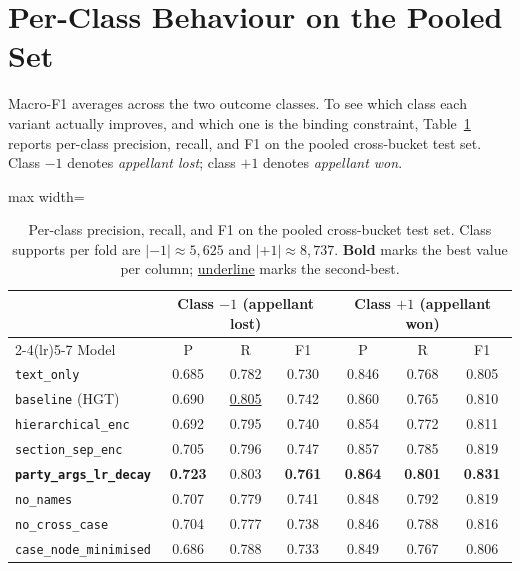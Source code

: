 \section{Per-Class Behaviour on the Pooled Set}
\label{sec:per_class_behaviour}

Macro-F1 averages across the two outcome classes. To see which class
each variant actually improves, and which one is the binding
constraint, Table~\ref{tab:per_class_pooled} reports per-class
precision, recall, and F1 on the pooled cross-bucket test set. Class
$-1$ denotes \emph{appellant lost}; class $+1$ denotes
\emph{appellant won}.

\begin{table}[H]
  \centering
  \scriptsize
  \setlength{\tabcolsep}{5pt}
  \begin{adjustbox}{max width=\textwidth}
  \begin{tabular}{lcccccc}
    \toprule
    & \multicolumn{3}{c}{Class $-1$ (appellant lost)} & \multicolumn{3}{c}{Class $+1$ (appellant won)} \\
    \cmidrule(lr){2-4}\cmidrule(lr){5-7}
    Model & P & R & F1 & P & R & F1 \\
    \midrule
    \texttt{text\_only} & 0.685 & 0.782 & 0.730 & 0.846 & 0.768 & 0.805 \\
    \texttt{baseline} (HGT) & 0.690 & \underline{0.805} & 0.742 & 0.860 & 0.765 & 0.810 \\
    \texttt{hierarchical\_enc} & 0.692 & 0.795 & 0.740 & 0.854 & 0.772 & 0.811 \\
    \texttt{section\_sep\_enc} & 0.705 & 0.796 & 0.747 & 0.857 & 0.785 & 0.819 \\
    \textbf{\texttt{party\_args\_lr\_decay}} & \textbf{0.723} & 0.803 & \textbf{0.761} & \textbf{0.864} & \textbf{0.801} & \textbf{0.831} \\
    \texttt{no\_names} & 0.707 & 0.779 & 0.741 & 0.848 & 0.792 & 0.819 \\
    \texttt{no\_cross\_case} & 0.704 & 0.777 & 0.738 & 0.846 & 0.788 & 0.816 \\
    \texttt{case\_node\_minimised} & 0.686 & 0.788 & 0.733 & 0.849 & 0.767 & 0.806 \\
    \bottomrule
  \end{tabular}
  \end{adjustbox}
  \caption{Per-class precision, recall, and F1 on the pooled
  cross-bucket test set. Class supports per fold are
  $|{-1}|\!\approx\!5{,}625$ and $|{+1}|\!\approx\!8{,}737$.
  \textbf{Bold} marks the best value per column;
  \underline{underline} marks the second-best.}
  \label{tab:per_class_pooled}
\end{table}

